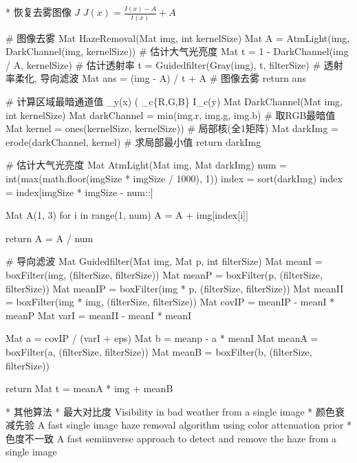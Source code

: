 			* 恢复去雾图像 $J$
				$J(x) = \frac{I(x) - A}{t(x)} + A$

		\Code
			# 图像去雾
			Mat HazeRemoval(Mat img, int kernelSize)
				Mat A = AtmLight(img, DarkChannel(img, kernelSize)) # 估计大气光亮度
				Mat t = 1 - DarkChannel(img / A, kernelSize)	# 估计透射率 
				t = Guidedfilter(Gray(img), t, filterSize)		# 透射率柔化, 导向滤波
				Mat ans = (img - A) / t + A						# 图像去雾
				return ans

			# 计算区域最暗通道值 \min_{y\in \Omega(x)} ( \min_{c\in \{R,G,B\}} I_c(y)
			Mat DarkChannel(Mat img, int kernelSize)
				Mat darkChannel = min(img.r, img.g, img.b)		# 取RGB最暗值
				Mat kernel  = ones(kernelSize, kernelSize))		# 局部核(全1矩阵)
				Mat darkImg = erode(darkChannel, kernel)		# 求局部最小值
				return darkImg

			# 估计大气光亮度
			Mat AtmLight(Mat img, Mat darkImg)			
				num   = int(max(math.floor(imgSize * imgSize / 1000), 1))
				index = sort(darkImg)
				index = index[imgSize * imgSize - num::]
			
				Mat A(1, 3)
				for i in range(1, num)
					A = A + img[index[i]]
			
				return A = A / num

			# 导向滤波
			Mat Guidedfilter(Mat img, Mat p, int filterSize)
				Mat meanI  = boxFilter(img, (filterSize, filterSize))
				Mat meanP  = boxFilter(p,   (filterSize, filterSize))
				Mat meanIP = boxFilter(img * p,   (filterSize, filterSize))
				Mat meanII = boxFilter(img * img, (filterSize, filterSize))
				Mat covIP  = meanIP - meanI * meanP
				Mat varI   = meanII - meanI * meanI

				Mat a = covIP / (varI + eps)
				Mat b = meanp - a * meanI
				Mat meanA 	= boxFilter(a, (filterSize, filterSize))
				Mat meanB 	= boxFilter(b, (filterSize, filterSize))
			
				return Mat t = meanA * img + meanB

		* 其他算法
			* 最大对比度    Visibility in bad weather from a single image
			* 颜色衰减先验    A fast single image haze removal algorithm using color attenuation prior
			* 色度不一致    A fast semiinverse approach to detect and remove the haze from a single image
